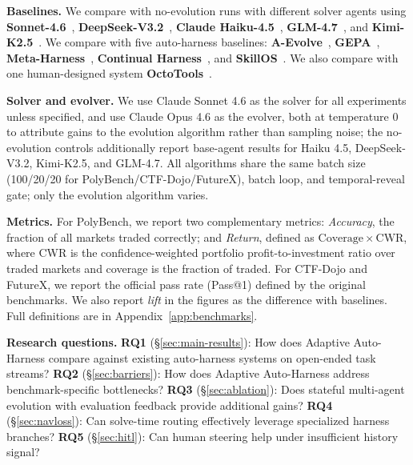 \documentclass[11pt]{article}
\theoremstyle{plain}
\begin{document}
\noindent\textbf{Baselines.} We compare with no-evolution runs with different solver agents using \textbf{Sonnet-4.6}~\cite{anthropic2025claude46}, \textbf{DeepSeek-V3.2}~\cite{deepseek2024v3}, \textbf{Claude Haiku-4.5}~\cite{anthropic2025haiku45}, \textbf{GLM-4.7}~\cite{glm2024chatglm}, and \textbf{Kimi-K2.5}~\cite{moonshot2025kimik2}. We compare with five auto-harness baselines: \textbf{A-Evolve}~\cite{lin2026position}, \textbf{GEPA}~\cite{agrawal2025gepa}, \textbf{Meta-Harness}~\cite{lee2026meta}, \textbf{Continual Harness}~\cite{karten2026continual}, and \textbf{SkillOS}~\cite{ouyang2026skillos}. We also compare with one human-designed system \textbf{OctoTools}~\cite{lu2025octotools}.


\noindent\textbf{Solver and evolver.} We use Claude Sonnet 4.6 as the solver for all experiments unless specified, and use Claude Opus 4.6 as the evolver, both at temperature 0 to attribute gains to the evolution algorithm rather than sampling noise; the no-evolution controls additionally report base-agent results for Haiku 4.5, DeepSeek-V3.2, Kimi-K2.5, and GLM-4.7. All algorithms share the same batch size (100/20/20 for PolyBench/CTF-Dojo/FutureX), batch loop, and temporal-reveal gate; only the evolution algorithm varies.

\noindent\textbf{Metrics.} For PolyBench, we report two complementary metrics: \emph{Accuracy}, the fraction of all markets traded correctly; and \emph{Return}, defined as $\mathrm{Coverage}\times\mathrm{CWR}$, where CWR is the confidence-weighted portfolio profit-to-investment ratio over traded markets and coverage is the fraction of traded. For CTF-Dojo and FutureX, we report the official pass rate (Pass@1) defined by the original benchmarks. We also report \emph{lift} in the figures as the difference with baselines. Full definitions are in Appendix~\ref{app:benchmarks}.



\noindent\textbf{Research questions.}
\textbf{RQ1} (\S\ref{sec:main-results}): How does Adaptive Auto-Harness compare against existing auto-harness systems on open-ended task streams?
\textbf{RQ2} (\S\ref{sec:barriers}): How does Adaptive Auto-Harness address benchmark-specific bottlenecks?
\textbf{RQ3} (\S\ref{sec:ablation}): Does stateful multi-agent evolution with evaluation feedback provide additional gains?
\textbf{RQ4} (\S\ref{sec:navloss}): Can solve-time routing effectively leverage specialized harness branches?
\textbf{RQ5} (\S\ref{sec:hitl}): Can human steering help under insufficient history signal?
\end{document}
